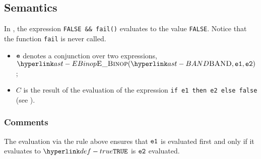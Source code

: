 \FormallyParagraph
\begin{mathpar}
\end{mathpar}

\subsection{Semantics}
In ,
the expression \texttt{FALSE \&\& fail()} evaluates to the value \texttt{FALSE}. Notice that the function \texttt{fail} is never called.

\ProseParagraph
\AllApply
\begin{itemize}
\item $\ve$ denotes a conjunction over two expressions,
      $\EBinop(\BAND, \veone, \vetwo)$;
\item $C$ is the result of the evaluation of the expression
      \texttt{if e1 then e2 else false} (see ).
\end{itemize}

\FormallyParagraph
\begin{mathpar}
\end{mathpar}

\subsubsection{Comments}
The evaluation via the rule above ensures that $\veone$ is evaluated first and
only if it evaluates to $\True$ is $\vetwo$ evaluated.

